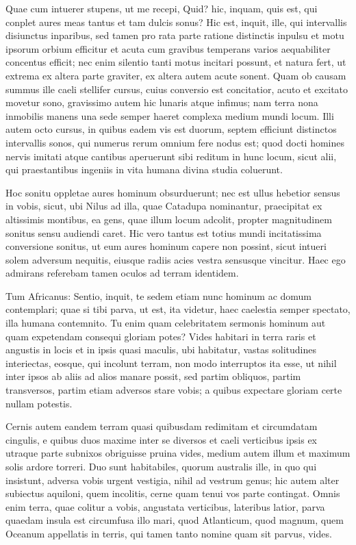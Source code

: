  Quae cum intuerer stupens, ut me recepi, Quid? hic, inquam, quis est, qui conplet aures meas tantus et tam dulcis sonus? Hic est, inquit, ille, qui intervallis disiunctus inparibus, sed tamen pro rata parte ratione distinctis inpulsu et motu ipsorum orbium efficitur et acuta cum gravibus temperans varios aequabiliter concentus efficit; nec enim silentio tanti motus incitari possunt, et natura fert, ut extrema ex altera parte graviter, ex altera autem acute sonent. Quam ob causam summus ille caeli stellifer cursus, cuius conversio est concitatior, acuto et excitato movetur sono, gravissimo autem hic lunaris atque infimus; nam terra nona inmobilis manens una sede semper haeret complexa medium mundi locum. Illi autem octo cursus, in quibus eadem vis est duorum, septem efficiunt distinctos intervallis sonos, qui numerus rerum omnium fere nodus est; quod docti homines nervis imitati atque cantibus aperuerunt sibi reditum in hunc locum, sicut alii, qui praestantibus ingeniis in vita humana divina studia coluerunt.

 Hoc sonitu oppletae aures hominum obsurduerunt; nec est ullus hebetior sensus in vobis, sicut, ubi Nilus ad illa, quae Catadupa nominantur, praecipitat ex altissimis montibus, ea gens, quae illum locum adcolit, propter magnitudinem sonitus sensu audiendi caret. Hic vero tantus est totius mundi incitatissima conversione sonitus, ut eum aures hominum capere non possint, sicut intueri solem adversum nequitis, eiusque radiis acies vestra sensusque vincitur. Haec ego admirans referebam tamen oculos ad terram identidem.

 Tum Africanus: Sentio, inquit, te sedem etiam nunc hominum ac domum contemplari; quae si tibi parva, ut est, ita videtur, haec caelestia semper spectato, illa humana contemnito. Tu enim quam celebritatem sermonis hominum aut quam expetendam consequi gloriam potes? Vides habitari in terra raris et angustis in locis et in ipsis quasi maculis, ubi habitatur, vastas solitudines interiectas, eosque, qui incolunt terram, non modo interruptos ita esse, ut nihil inter ipsos ab aliis ad alios manare possit, sed partim obliquos, partim transversos, partim etiam adversos stare vobis; a quibus expectare gloriam certe nullam potestis.

 Cernis autem eandem terram quasi quibusdam redimitam et circumdatam cingulis, e quibus duos maxime inter se diversos et caeli verticibus ipsis ex utraque parte subnixos obriguisse pruina vides, medium autem illum et maximum solis ardore torreri. Duo sunt habitabiles, quorum australis ille, in quo qui insistunt, adversa vobis urgent vestigia, nihil ad vestrum genus; hic autem alter subiectus aquiloni, quem incolitis, cerne quam tenui vos parte contingat. Omnis enim terra, quae colitur a vobis, angustata verticibus, lateribus latior, parva quaedam insula est circumfusa illo mari, quod Atlanticum, quod magnum, quem Oceanum appellatis in terris, qui tamen tanto nomine quam sit parvus, vides.

